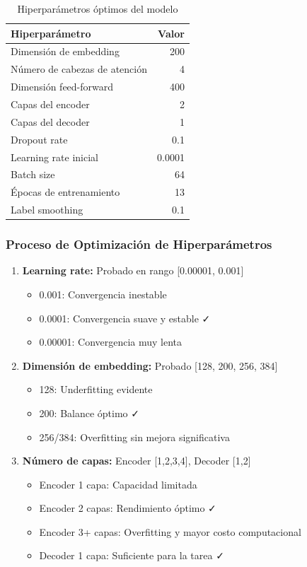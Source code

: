 \documentclass[12pt,a4paper]{article}
\begin{document}
\begin{table}[H]
\centering
\begin{tabular}{|l|r|}
\hline
\textbf{Hiperparámetro} & \textbf{Valor} \\
\hline
Dimensión de embedding & 200 \\
\hline
Número de cabezas de atención & 4 \\
\hline
Dimensión feed-forward & 400 \\
\hline
Capas del encoder & 2 \\
\hline
Capas del decoder & 1 \\
\hline
Dropout rate & 0.1 \\
\hline
Learning rate inicial & 0.0001 \\
\hline
Batch size & 64 \\
\hline
Épocas de entrenamiento & 13 \\
\hline
Label smoothing & 0.1 \\
\hline
\end{tabular}
\caption{Hiperparámetros óptimos del modelo}
\end{table}

\subsubsection{Proceso de Optimización de Hiperparámetros}
\begin{enumerate}
    \item \textbf{Learning rate:} Probado en rango [0.00001, 0.001]
    \begin{itemize}
        \item 0.001: Convergencia inestable
        \item 0.0001: Convergencia suave y estable ✓
        \item 0.00001: Convergencia muy lenta
    \end{itemize}
    
    \item \textbf{Dimensión de embedding:} Probado [128, 200, 256, 384]
    \begin{itemize}
        \item 128: Underfitting evidente
        \item 200: Balance óptimo ✓
        \item 256/384: Overfitting sin mejora significativa
    \end{itemize}
    
    \item \textbf{Número de capas:} Encoder [1,2,3,4], Decoder [1,2]
    \begin{itemize}
        \item Encoder 1 capa: Capacidad limitada
        \item Encoder 2 capas: Rendimiento óptimo ✓
        \item Encoder 3+ capas: Overfitting y mayor costo computacional
        \item Decoder 1 capa: Suficiente para la tarea ✓
    \end{itemize}
\end{enumerate}
\end{document}
